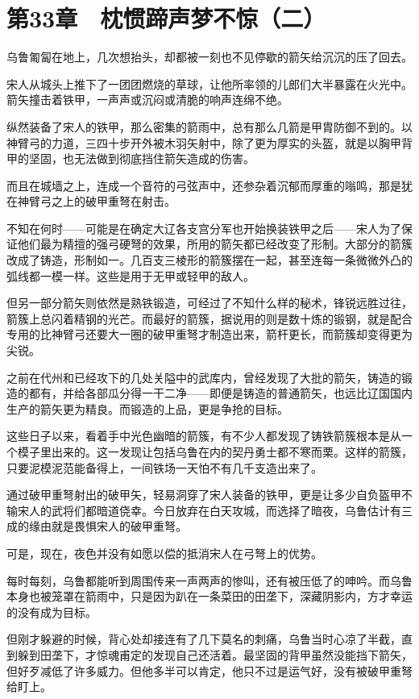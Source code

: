 \section{第33章　枕惯蹄声梦不惊（二）}

乌鲁匍匐在地上，几次想抬头，却都被一刻也不见停歇的箭矢给沉沉的压了回去。

宋人从城头上推下了一团团燃烧的草球，让他所率领的儿郎们大半暴露在火光中。箭矢撞击着铁甲，一声声或沉闷或清脆的响声连绵不绝。

纵然装备了宋人的铁甲，那么密集的箭雨中，总有那么几箭是甲胄防御不到的。以神臂弓的力道，三四十步开外被木羽矢射中，除了更为厚实的头盔，就是以胸甲背甲的坚固，也无法做到彻底挡住箭矢造成的伤害。

而且在城墙之上，连成一个音符的弓弦声中，还参杂着沉郁而厚重的嗡鸣，那是犹在神臂弓之上的破甲重弩在射击。

不知在何时——可能是在确定大辽各支宫分军也开始换装铁甲之后——宋人为了保证他们最为精擅的强弓硬弩的效果，所用的箭矢都已经改变了形制。大部分的箭簇改成了铸造，形制如一。几百支三棱形的箭簇摆在一起，甚至连每一条微微外凸的弧线都一模一样。这些是用于无甲或轻甲的敌人。

但另一部分箭矢则依然是熟铁锻造，可经过了不知什么样的秘术，锋锐远胜过往，箭簇上总闪着精钢的光芒。而最好的箭簇，据说用的则是数十炼的锻钢，就是配合专用的比神臂弓还要大一圈的破甲重弩才制造出来，箭杆更长，而箭簇却变得更为尖锐。

之前在代州和已经攻下的几处关隘中的武库内，曾经发现了大批的箭矢，铸造的锻造的都有，并给各部瓜分得一干二净——即便是铸造的普通箭矢，也远比辽国国内生产的箭矢更为精良。而锻造的上品，更是争抢的目标。

这些日子以来，看着手中光色幽暗的箭簇，有不少人都发现了铸铁箭簇根本是从一个模子里出来的。这一发现让包括乌鲁在内的契丹勇士都不寒而栗。这样的箭簇，只要泥模泥范能备得上，一间铁场一天怕不有几千支造出来了。

通过破甲重弩射出的破甲矢，轻易洞穿了宋人装备的铁甲，更是让多少自负盔甲不输宋人的武将们都暗道侥幸。今日放弃在白天攻城，而选择了暗夜，乌鲁估计有三成的缘由就是畏惧宋人的破甲重弩。

可是，现在，夜色并没有如愿以偿的抵消宋人在弓弩上的优势。

每时每刻，乌鲁都能听到周围传来一声两声的惨叫，还有被压低了的呻吟。而乌鲁本身也被笼罩在箭雨中，只是因为趴在一条菜田的田垄下，深藏阴影内，方才幸运的没有成为目标。

但刚才躲避的时候，背心处却接连有了几下莫名的刺痛，乌鲁当时心凉了半截，直到躲到田垄下，才惊魂甫定的发现自己还活着。最坚固的背甲虽然没能挡下箭矢，但好歹减低了许多威力。但他多半可以肯定，他只不过是运气好，没有被破甲重弩给盯上。

